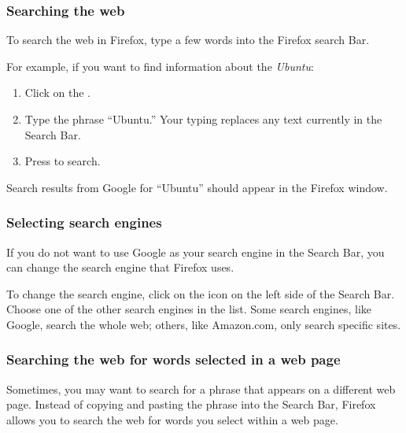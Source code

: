 \subsubsection{Searching the web}

To search the web in Firefox, type a few words into the Firefox search Bar.

For example, if you want to find information about the \emph{Ubuntu}:

\begin{enumerate}
   \item Click on the .
   \item Type the phrase ``Ubuntu.'' Your typing replaces any text currently in the Search Bar.
   \item Press  to search.
\end{enumerate}

Search results from Google for ``Ubuntu'' should appear in the Firefox 
window. 

\subsubsection{Selecting search engines}


If you do not want to use Google as your search engine in the Search Bar, 
you can change the search engine that Firefox uses.


To change the search engine, click on the icon on the left side of the Search 
Bar. Choose one of the other search engines in the list. Some search engines, 
like Google, search the whole web; others, like Amazon.com, only search 
specific sites. 


\subsubsection{Searching the web for words selected in a web page}

Sometimes, you may want to search for a phrase that appears on a different web
page. Instead of copying and pasting the phrase into the Search Bar, 
Firefox allows you to search the web for words you select within a web page.

